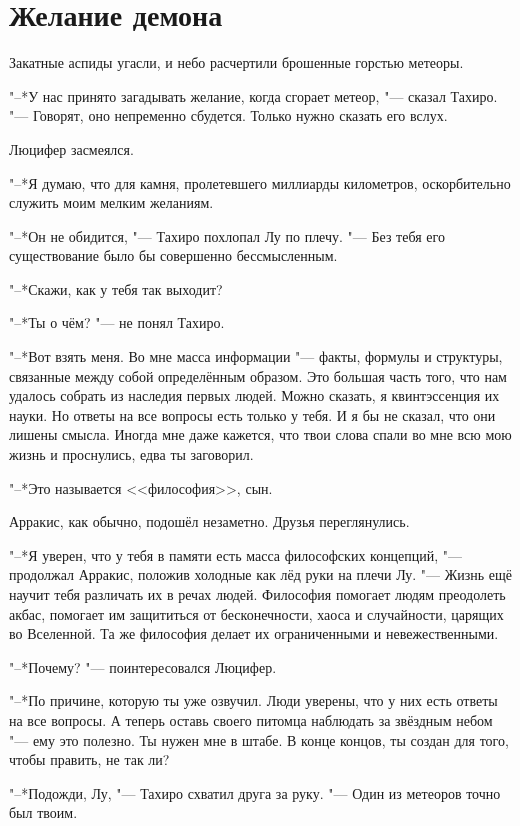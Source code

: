 \documentclass[a4paper,10pt]{book}
\begin{document}
\section{Желание демона}

Закатные аспиды угасли, и небо расчертили брошенные горстью метеоры. 

"--*У нас принято загадывать желание, когда сгорает метеор, "--- сказал Тахиро.
"--- Говорят, оно непременно сбудется.
Только нужно сказать его вслух.

Люцифер засмеялся.

"--*Я думаю, что для камня, пролетевшего миллиарды километров, оскорбительно служить моим мелким желаниям.

"--*Он не обидится, "--- Тахиро похлопал Лу по плечу.
"--- Без тебя его существование было бы совершенно бессмысленным.

"--*Скажи, как у тебя так выходит?

"--*Ты о чём? "--- не понял Тахиро.

"--*Вот взять меня.
Во мне масса информации "--- факты, формулы и структуры, связанные между собой определённым образом.
Это большая часть того, что нам удалось собрать из наследия первых людей.
Можно сказать, я квинтэссенция их науки.
Но ответы на все вопросы есть только у тебя. 
И я бы не сказал, что они лишены смысла.
Иногда мне даже кажется, что твои слова спали во мне всю мою жизнь и проснулись, едва ты заговорил.

"--*Это называется <<философия>>, сын.

Арракис, как обычно, подошёл незаметно.
Друзья переглянулись.

"--*Я уверен, что у тебя в памяти есть масса философских концепций, "--- продолжал Арракис, положив холодные как лёд руки на плечи Лу.
"--- Жизнь ещё научит тебя различать их в речах людей.
Философия помогает людям преодолеть акбас, помогает им защититься от бесконечности, хаоса и случайности, царящих во Вселенной.
Та же философия делает их ограниченными и невежественными.

"--*Почему? "--- поинтересовался Люцифер.

"--*По причине, которую ты уже озвучил.
Люди уверены, что у них есть ответы на все вопросы.
А теперь оставь своего питомца наблюдать за звёздным небом "--- ему это полезно.
Ты нужен мне в штабе.
В конце концов, ты создан для того, чтобы править, не так ли?

"--*Подожди, Лу, "--- Тахиро схватил друга за руку.
"--- Один из метеоров точно был твоим.
\end{document}
